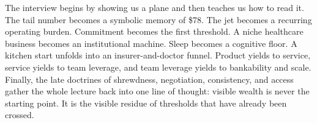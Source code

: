 The interview begins by showing us a plane and then teaches us how to read it. The tail number becomes a symbolic memory of \$78. The jet becomes a recurring operating burden. Commitment becomes the first threshold. A niche healthcare business becomes an institutional machine. Sleep becomes a cognitive floor. A kitchen start unfolds into an insurer-and-doctor funnel. Product yields to service, service yields to team leverage, and team leverage yields to bankability and scale. Finally, the late doctrines of shrewdness, negotiation, consistency, and access gather the whole lecture back into one line of thought: visible wealth is never the starting point. It is the visible residue of thresholds that have already been crossed.